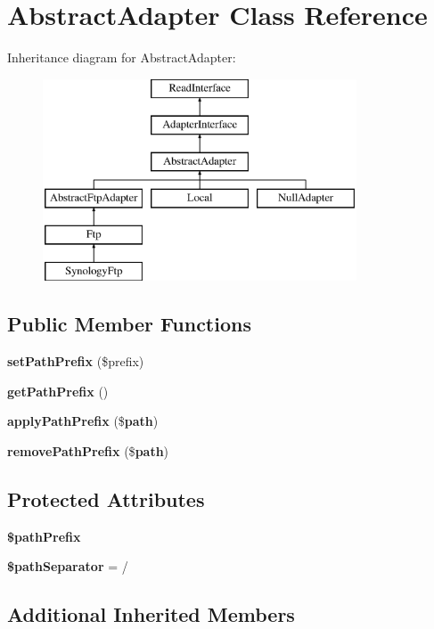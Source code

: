 \section{Abstract\+Adapter Class Reference}
\label{class_league_1_1_flysystem_1_1_adapter_1_1_abstract_adapter}
Inheritance diagram for Abstract\+Adapter\+:\begin{figure}[H]
\begin{center}
\leavevmode
\includegraphics[height=6.000000cm]{class_league_1_1_flysystem_1_1_adapter_1_1_abstract_adapter}
\end{center}
\end{figure}
\subsection*{Public Member Functions}
\begin{DoxyCompactItemize}
\item 
{\bf set\+Path\+Prefix} (\$prefix)
\item 
{\bf get\+Path\+Prefix} ()
\item 
{\bf apply\+Path\+Prefix} (\${\bf path})
\item 
{\bf remove\+Path\+Prefix} (\${\bf path})
\end{DoxyCompactItemize}
\subsection*{Protected Attributes}
\begin{DoxyCompactItemize}
\item 
{\bf \$path\+Prefix}
\item 
{\bf \$path\+Separator} = \textquotesingle{}/\textquotesingle{}
\end{DoxyCompactItemize}
\subsection*{Additional Inherited Members}


